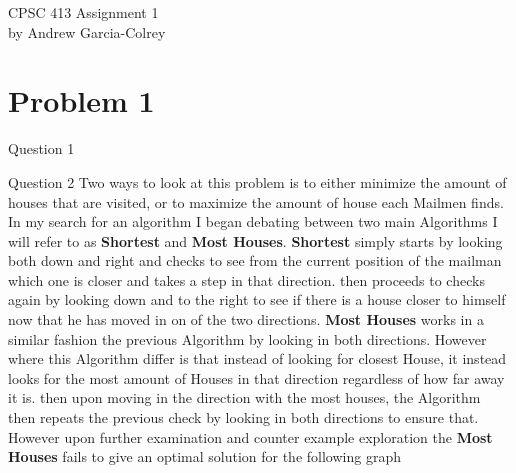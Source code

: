 \documentclass[11pt]{article}
\author{Andrew}
\date{text }
\begin{document}
\begin{center}
CPSC 413 Assignment 1 \\
by Andrew Garcia-Colrey
\end{center}
\section{Problem 1}
Question 1
\begin{center}
\end{center}
Question 2
\hfill \break
\break
Two ways to look at this problem is to either minimize the amount of houses that are visited, or to maximize the amount of house each Mailmen finds. In my search for an algorithm I began debating between two main Algorithms I will refer to as \textbf{Shortest}  and \textbf{Most Houses}. 
\hfill \break
\break
\textbf{Shortest} simply starts by looking both down and right and checks to see from the current position of the mailman which one is closer and takes a step in that direction. then proceeds to checks again by looking down and to the right to see if there is a house closer to himself now that he has moved in on of the two directions.
\hfill \break
\break
 \textbf{Most Houses} works in a similar fashion the previous Algorithm by looking in both directions. However where this Algorithm differ is that instead of looking for closest House, it instead looks for the most amount of Houses in that direction regardless of how far away it is. then upon moving in the direction with the most houses, the Algorithm then repeats the previous check by looking in both directions to ensure that.
 \hfill \break
\break
However upon further examination and counter example exploration the  \textbf{Most Houses} fails to give an optimal solution for the following graph
\end{document}
